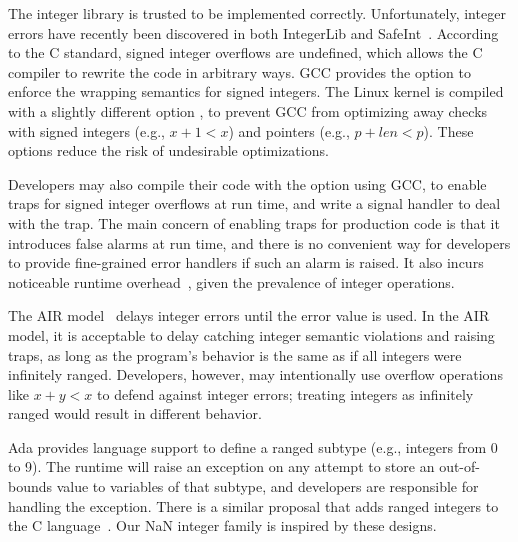 
The integer library is trusted to be implemented correctly.
Unfortunately, integer errors have recently been discovered in both
IntegerLib and SafeInt~\cite{ioc}.
%
%
%
According to the C standard, signed integer overflows are undefined,
which allows the C compiler to rewrite the code in arbitrary ways.
GCC provides the option  to enforce the wrapping semantics
for signed integers.  The Linux kernel is compiled with a slightly
different option , to prevent GCC from
optimizing away checks with signed integers (e.g., $x + 1 < x$) and
pointers (e.g., $p + \mathit{len} < p$).  These options reduce the
risk of undesirable optimizations.

Developers may also compile their code with the  option
using GCC, to enable traps for signed integer overflows at run time,
and write a signal handler to deal with the trap.
The main concern of enabling traps for production code
is that it introduces false alarms at run time, and there is no
convenient way for developers to provide fine-grained error handlers
if such an alarm is raised.  It also incurs noticeable runtime
overhead~\cite{ioc}, given the prevalence of integer operations.

The AIR model~\cite{air} delays integer errors until the error value
is used.  In the AIR model, it is acceptable to delay
catching integer semantic violations and raising traps, as long as the program's
behavior is the same as if all integers were infinitely ranged.
Developers, however, may intentionally use overflow operations like
$x + y < x$ to defend against integer errors; treating integers as
infinitely ranged would result in different behavior.
\fi

Ada provides language support
to define a ranged subtype (e.g., integers from 0 to 9).  The runtime
will raise an exception on any attempt to store an out-of-bounds
value to variables of that subtype, and developers are responsible
for handling the exception.  There is a similar proposal that adds
ranged integers to the C language~\cite{ranged-c}.  Our NaN integer family is
inspired by these designs.


